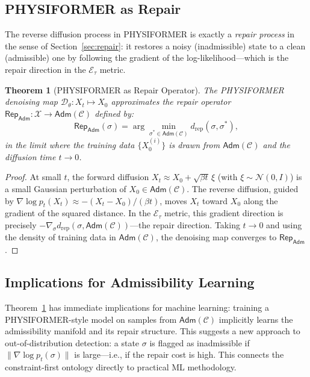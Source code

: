 \documentclass[a4paper,12pt]{article}
\newtheorem{theorem}{Theorem}[section]
\theoremstyle{definition}
\newcommand{\Etau}{\mathcal{E}_\tau}
\newcommand{\X}{\mathcal{X}}
\newcommand{\Adm}{\mathsf{Adm}}
\newcommand{\Rep}{\mathsf{Rep}}
\newcommand{\dRP}{d_{\mathrm{rep}}}
\begin{document}
\subsection{PHYSIFORMER as Repair}

The reverse diffusion process in PHYSIFORMER is exactly a \emph{repair process} in the sense of Section~\ref{sec:repair}: it restores a noisy (inadmissible) state to a clean (admissible) one by following the gradient of the log-likelihood—which is the repair direction in the $\Etau$ metric.

\begin{theorem}[PHYSIFORMER as Repair Operator]
\label{thm:physiformer_repair}
The PHYSIFORMER denoising map $\mathcal{D}_\theta: X_t \mapsto X_0$ approximates the repair operator $\Rep_{\Adm}: \X \to \Adm(\mathcal{C})$ defined by:
\[
\Rep_{\Adm}(\sigma) = \arg\min_{\sigma^* \in \Adm(\mathcal{C})} \dRP(\sigma, \sigma^*),
\]
in the limit where the training data $\{X_0^{(i)}\}$ is drawn from $\Adm(\mathcal{C})$ and the diffusion time $t \to 0$.
\end{theorem}

\begin{proof}
At small $t$, the forward diffusion $X_t \approx X_0 + \sqrt{\beta t} \, \xi$ (with $\xi \sim \mathcal{N}(0, I)$) is a small Gaussian perturbation of $X_0 \in \Adm(\mathcal{C})$. The reverse diffusion, guided by $\nabla \log p_t(X_t) \approx -(X_t - X_0)/(\beta t)$, moves $X_t$ toward $X_0$ along the gradient of the squared distance. In the $\Etau$ metric, this gradient direction is precisely $-\nabla_\sigma \dRP(\sigma, \Adm(\mathcal{C}))$—the repair direction. Taking $t \to 0$ and using the density of training data in $\Adm(\mathcal{C})$, the denoising map converges to $\Rep_{\Adm}$ \cite{Villani2008}.
\end{proof}

\subsection{Implications for Admissibility Learning}

Theorem~\ref{thm:physiformer_repair} has immediate implications for machine learning: training a PHYSIFORMER-style model on samples from $\Adm(\mathcal{C})$ implicitly learns the admissibility manifold and its repair structure. This suggests a new approach to out-of-distribution detection: a state $\sigma$ is flagged as inadmissible if $\|\nabla \log p_t(\sigma)\|$ is large—i.e., if the repair cost is high. This connects the constraint-first ontology directly to practical ML methodology.
\end{document}
